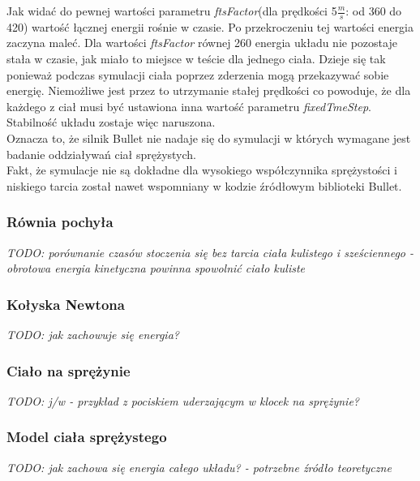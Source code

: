 Jak widać do pewnej wartości parametru \emph{ftsFactor}(dla prędkości 5$
\frac{m}{s} $: od 360 do 420) wartość łącznej energii rośnie w czasie. Po
przekroczeniu tej wartości energia zaczyna maleć. Dla wartości \emph{ftsFactor}
równej 260 energia układu nie pozostaje stała w czasie, jak miało to miejsce w
teście dla jednego ciała. Dzieje się tak ponieważ podczas symulacji ciała
poprzez zderzenia mogą przekazywać sobie energię. Niemożliwe jest przez to
utrzymanie stałej prędkości co powoduje, że dla każdego z ciał musi być
ustawiona inna wartość parametru \emph{fixedTmeStep}. Stabilność układu zostaje
więc naruszona.\\
Oznacza to, że silnik Bullet nie nadaje się do symulacji w których wymagane jest
badanie oddziaływań ciał sprężystych.\\
Fakt, że symulacje nie są dokładne dla wysokiego współczynnika sprężystości i
niskiego tarcia został nawet wspomniany w kodzie źródłowym biblioteki Bullet.




\subsubsection{Równia pochyła}
\emph{TODO: porównanie czasów stoczenia się bez tarcia ciała kulistego i
sześciennego - obrotowa energia kinetyczna powinna spowolnić ciało kuliste}\\

\subsubsection{Kołyska Newtona}
\emph{TODO: jak zachowuje się energia?}

\subsubsection{Ciało na sprężynie}
\emph{TODO: j/w - przykład z pociskiem uderzającym w klocek na sprężynie?}

\subsubsection{Model ciała sprężystego}
\emph{TODO: jak zachowa się energia całego układu? - potrzebne źródło
teoretyczne}

